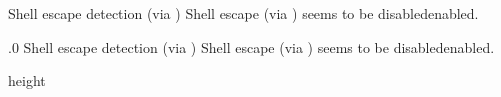 %
%
%

 {Shell escape detection (via )}
Shell escape (via ) seems to be
 disabled\else enabled\fi.
\endfeature


.0 {Shell escape detection (via \cs\pdfshellescape)}
Shell escape (via \cs\pdfshellescape) seems to be
\ifnum{} disabled\else enabled\fi.
\endfeature


\newpage



\pdfximage height       %
\topskip=0pt
\pdfrefximage \pdflastximage
\newpage


